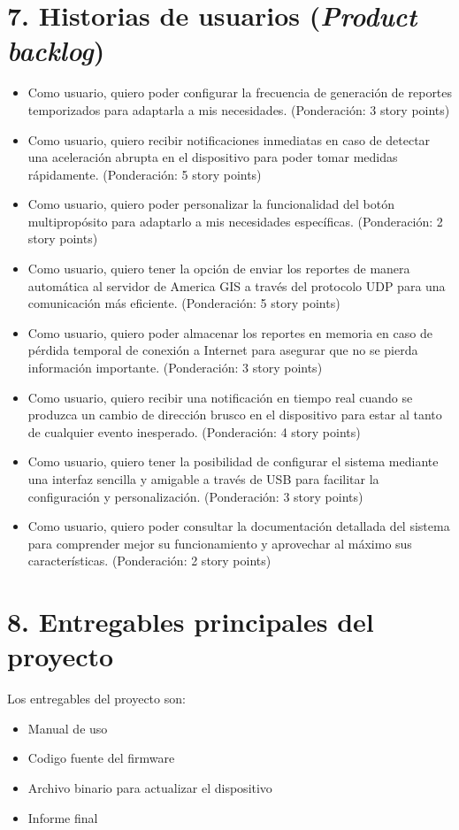 \documentclass[
11pt, %
codirector, %
]{charter}
\begin{document}
\section{7. Historias de usuarios (\textit{Product backlog})}
\label{sec:backlog}
\begin{itemize}
    \item Como usuario, quiero poder configurar la frecuencia de generación de reportes temporizados para adaptarla a mis necesidades. (Ponderación: 3 story points)
    \item Como usuario, quiero recibir notificaciones inmediatas en caso de detectar una aceleración abrupta en el dispositivo para poder tomar medidas rápidamente. (Ponderación: 5 story points)
    \item Como usuario, quiero poder personalizar la funcionalidad del botón multipropósito para adaptarlo a mis necesidades específicas. (Ponderación: 2 story points)
    \item Como usuario, quiero tener la opción de enviar los reportes de manera automática al servidor de America GIS a través del protocolo UDP para una comunicación más eficiente. (Ponderación: 5 story points)
    \item Como usuario, quiero poder almacenar los reportes en memoria en caso de pérdida temporal de conexión a Internet para asegurar que no se pierda información importante. (Ponderación: 3 story points)
    \item Como usuario, quiero recibir una notificación en tiempo real cuando se produzca un cambio de dirección brusco en el dispositivo para estar al tanto de cualquier evento inesperado. (Ponderación: 4 story points)
    \item Como usuario, quiero tener la posibilidad de configurar el sistema mediante una interfaz sencilla y amigable a través de USB para facilitar la configuración y personalización. (Ponderación: 3 story points)
    \item Como usuario, quiero poder consultar la documentación detallada del sistema para comprender mejor su funcionamiento y aprovechar al máximo sus características. (Ponderación: 2 story points)
\end{itemize}


\section{8. Entregables principales del proyecto}
\label{sec:entregables}

Los entregables del proyecto son:
\begin{itemize}
    \item Manual de uso
    \item Codigo fuente del firmware
    \item Archivo binario para actualizar el dispositivo
    \item Informe final
\end{itemize}
\end{document}
